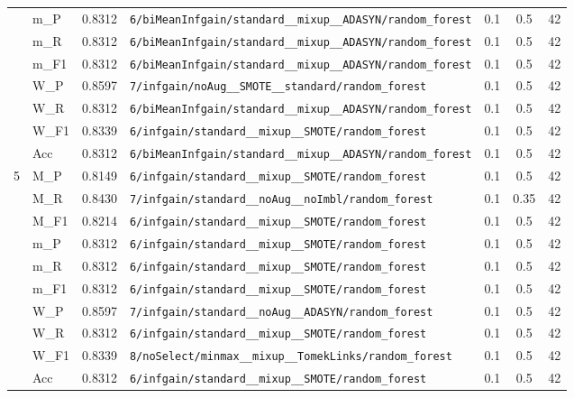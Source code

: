 \begin{table}[htbp]
\begin{tabular}{|c|l|c|>{\ttfamily\footnotesize}p{7.2cm}|c|c|c|}
 & m\_P & 0.8312 & \texttt{6/biMeanInfgain/standard\_\_mixup\_\_ADASYN/random\_forest} & 0.1 & 0.5  & 42 \\ 
 & m\_R & 0.8312 & \texttt{6/biMeanInfgain/standard\_\_mixup\_\_ADASYN/random\_forest} & 0.1 & 0.5  & 42 \\ 
 & m\_F1 & 0.8312 & \texttt{6/biMeanInfgain/standard\_\_mixup\_\_ADASYN/random\_forest} & 0.1 & 0.5  & 42 \\ 
 & W\_P & 0.8597 & \texttt{7/infgain/noAug\_\_SMOTE\_\_standard/random\_forest} & 0.1 & 0.5  & 42 \\ 
 & W\_R & 0.8312 & \texttt{6/biMeanInfgain/standard\_\_mixup\_\_ADASYN/random\_forest} & 0.1 & 0.5  & 42 \\ 
 & W\_F1 & 0.8339 & \texttt{6/infgain/standard\_\_mixup\_\_SMOTE/random\_forest} & 0.1 & 0.5  & 42 \\ 
 & Acc & 0.8312 & \texttt{6/biMeanInfgain/standard\_\_mixup\_\_ADASYN/random\_forest} & 0.1 & 0.5  & 42 \\ 
\hline
\multirow{10}{*}{5} & M\_P & 0.8149 & \texttt{6/infgain/standard\_\_mixup\_\_SMOTE/random\_forest} & 0.1 & 0.5  & 42 \\ 
 & M\_R & 0.8430 & \texttt{7/infgain/standard\_\_noAug\_\_noImbl/random\_forest} & 0.1 & 0.35  & 42 \\ 
 & M\_F1 & 0.8214 & \texttt{6/infgain/standard\_\_mixup\_\_SMOTE/random\_forest} & 0.1 & 0.5  & 42 \\ 
 & m\_P & 0.8312 & \texttt{6/infgain/standard\_\_mixup\_\_SMOTE/random\_forest} & 0.1 & 0.5  & 42 \\ 
 & m\_R & 0.8312 & \texttt{6/infgain/standard\_\_mixup\_\_SMOTE/random\_forest} & 0.1 & 0.5  & 42 \\ 
 & m\_F1 & 0.8312 & \texttt{6/infgain/standard\_\_mixup\_\_SMOTE/random\_forest} & 0.1 & 0.5  & 42 \\ 
 & W\_P & 0.8597 & \texttt{7/infgain/standard\_\_noAug\_\_ADASYN/random\_forest} & 0.1 & 0.5  & 42 \\ 
 & W\_R & 0.8312 & \texttt{6/infgain/standard\_\_mixup\_\_SMOTE/random\_forest} & 0.1 & 0.5  & 42 \\ 
 & W\_F1 & 0.8339 & \texttt{8/noSelect/minmax\_\_mixup\_\_TomekLinks/random\_forest} & 0.1 & 0.5  & 42 \\ 
 & Acc & 0.8312 & \texttt{6/infgain/standard\_\_mixup\_\_SMOTE/random\_forest} & 0.1 & 0.5  & 42 \\ 
\hline
\end{tabular}
\end{table}